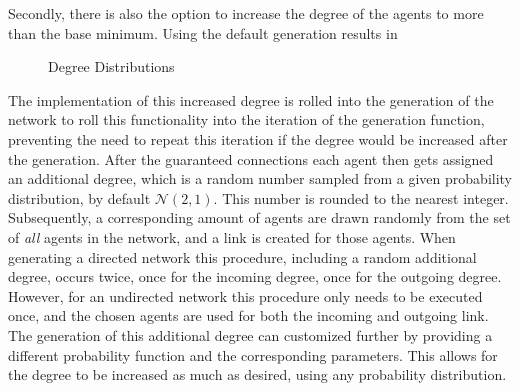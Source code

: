 \documentclass{article}
\begin{document}
Secondly, there is also the option to increase the degree of the agents to more than the base minimum. Using the default generation results in 
\begin{figure}[!htbp]
  \centering
  \hfill
  \caption{Degree Distributions}
\end{figure}

\newpage

The implementation of this increased degree is rolled into the generation of the network to roll this functionality into the iteration of the generation function, preventing the need to repeat this iteration if the degree would be increased after the generation. After the guaranteed connections each agent then gets assigned an additional degree, which is a random number sampled from a given probability distribution, by default $\mathcal{N}(2,1)$. This number is rounded to the nearest integer. Subsequently, a corresponding amount of agents are drawn randomly from the set of \emph{all} agents in the network, and a link is created for those agents. When generating a directed network this procedure, including a random additional degree, occurs twice, once for the incoming degree, once for the outgoing degree. However, for an undirected network this procedure only needs to be executed once, and the chosen agents are used for both the incoming and outgoing link. \newline
The generation of this additional degree can customized further by providing a different probability function and the corresponding parameters. This allows for the degree to be increased as much as desired, using any probability distribution.\newline
\end{document}
